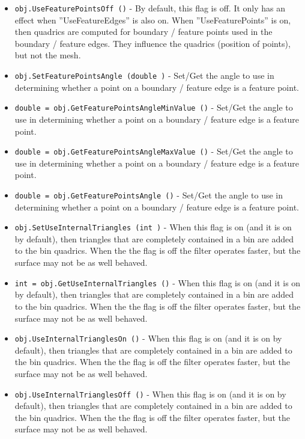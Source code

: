 \begin{itemize}
\item  \verb|obj.UseFeaturePointsOff ()| -  By default, this flag is off.  It only has an effect when
 ''UseFeatureEdges'' is also on.  When ''UseFeaturePoints'' is on, then
 quadrics are computed for boundary / feature points used in the boundary
 / feature edges.  They influence the quadrics (position of points), but
 not the mesh.

\item  \verb|obj.SetFeaturePointsAngle (double )| -  Set/Get the angle to use in determining whether a point on a boundary /
 feature edge is a feature point.

\item  \verb|double = obj.GetFeaturePointsAngleMinValue ()| -  Set/Get the angle to use in determining whether a point on a boundary /
 feature edge is a feature point.

\item  \verb|double = obj.GetFeaturePointsAngleMaxValue ()| -  Set/Get the angle to use in determining whether a point on a boundary /
 feature edge is a feature point.

\item  \verb|double = obj.GetFeaturePointsAngle ()| -  Set/Get the angle to use in determining whether a point on a boundary /
 feature edge is a feature point.

\item  \verb|obj.SetUseInternalTriangles (int )| -  When this flag is on (and it is on by default), then triangles that are 
 completely contained in a bin are added to the bin quadrics.  When the
 the flag is off the filter operates faster, but the surface may not be
 as well behaved.

\item  \verb|int = obj.GetUseInternalTriangles ()| -  When this flag is on (and it is on by default), then triangles that are 
 completely contained in a bin are added to the bin quadrics.  When the
 the flag is off the filter operates faster, but the surface may not be
 as well behaved.

\item  \verb|obj.UseInternalTrianglesOn ()| -  When this flag is on (and it is on by default), then triangles that are 
 completely contained in a bin are added to the bin quadrics.  When the
 the flag is off the filter operates faster, but the surface may not be
 as well behaved.

\item  \verb|obj.UseInternalTrianglesOff ()| -  When this flag is on (and it is on by default), then triangles that are 
 completely contained in a bin are added to the bin quadrics.  When the
 the flag is off the filter operates faster, but the surface may not be
 as well behaved.


\end{itemize}
